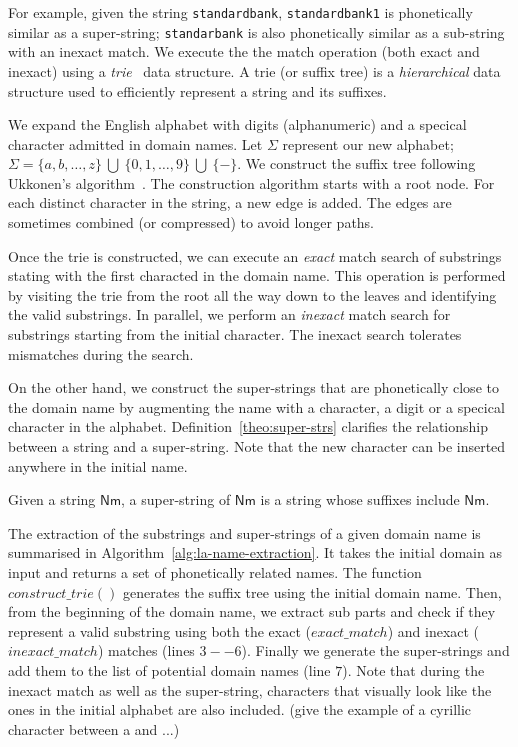 For example, given the string {\texttt{standardbank}}, {\texttt{standardbank1}} is phonetically similar as a super-string; {\texttt{standarbank}} is also phonetically similar as a sub-string with an inexact match. We execute the the match operation (both exact and inexact) using  a \emph{trie}~\cite{leis-kemper-neumann:2013,morrison:1968,gusfield:1997,ukkonen:1995} data structure. A trie (or suffix tree) is a \emph{hierarchical} data structure used to efficiently represent a string and its suffixes.

We expand the English alphabet with digits (alphanumeric) and a specical character admitted in domain names. Let $\Sigma$ represent our new alphabet; $\Sigma = \{a, b, \ldots, z\}~\bigcup~\{0, 1, \ldots, 9\}~\bigcup~\{-\}$. We construct the suffix tree following Ukkonen's algorithm~\cite{ukkonen:1995}. The construction algorithm starts with a root node. For each distinct character in the string, a new edge is added. The edges are sometimes combined (or compressed) to avoid longer paths. 


Once the trie is constructed, we can execute an \emph{exact} match search of substrings stating with the first characted in the domain name.  This operation is performed by visiting the trie from the root all the way down to the leaves and identifying the valid substrings. In parallel, we perform an \emph{inexact} match search for substrings starting from the initial character. The inexact search tolerates mismatches during the search.  

On the other hand, we construct the super-strings that are phonetically close to the domain name by augmenting the name with a character, a digit or a specical character in the alphabet. Definition~\ref{theo:super-strs} clarifies the relationship between a string and a super-string. Note that the new character can be inserted anywhere in the initial name. 

\begin{definition}
  \label{theo:super-strs}
  Given a string $\mathsf{Nm}$, a super-string of $\mathsf{Nm}$ is a string whose suffixes include $\mathsf{Nm}$.
\end{definition}

The extraction of the substrings and super-strings of a given domain name is summarised in Algorithm~\ref{alg:la-name-extraction}. It takes the initial domain as input and returns a set of phonetically related names. The function $\mathit{construct\_trie}()$ generates the suffix tree using the initial domain name. Then, from the beginning of the domain name, we extract sub parts and check if they represent a valid substring using both the exact ($\mathit{exact\_match}$) and inexact ($\mathit{inexact\_match}$) matches (lines $3 -- 6$). Finally we generate the super-strings and add them to the list of potential domain names (line $7$). Note that during the inexact match as well as the super-string, characters that visually look like the ones in the initial alphabet are also included. (give the example of a cyrillic character between a and ...)

